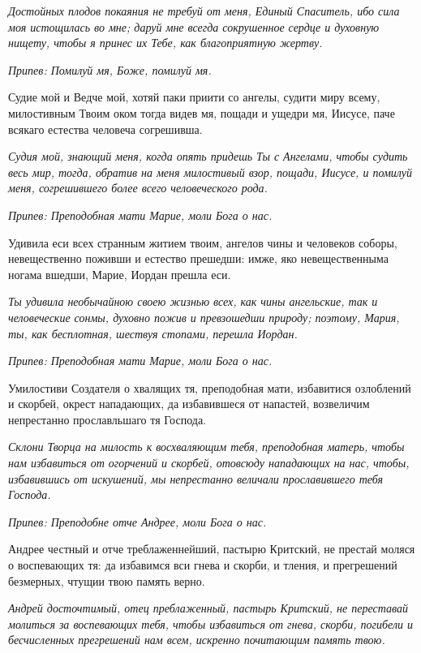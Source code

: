 \itshape Достойных плодов покаяния не требуй от меня, Единый Спаситель, ибо сила моя истощилась во мне; даруй мне всегда сокрушенное сердце и духовную нищету, чтобы я принес их Тебе, как благоприятную жертву.\normalfont{}


\itshape Припев:\normalfont{} Помилуй мя, Боже, помилуй мя.


Судие мой и Ведче мой, хотяй паки приити со ангелы, судити миру всему, милостивным Твоим оком тогда видев мя, пощади и ущедри мя, Иисусе, паче всякаго естества человеча согрешивша.


\itshape Судия мой, знающий меня, когда опять придешь Ты с Ангелами, чтобы судить весь мир, тогда, обратив на меня милостивый взор, пощади, Иисусе, и помилуй меня, согрешившего более всего человеческого рода.\normalfont{}


\itshape Припев:\normalfont{} Преподобная мати Марие, моли Бога о нас.


Удивила еси всех странным житием твоим, ангелов чины и человеков соборы, невещественно поживши и естество прешедши: имже, яко невещественныма ногама вшедши, Марие, Иордан прешла еси.


\itshape Ты удивила необычайною своею жизнью всех, как чины ангельские, так и человеческие сонмы, духовно пожив и превзошедши природу; поэтому, Мария, ты, как бесплотная, шествуя стопами, перешла Иордан.\normalfont{}


\itshape Припев:\normalfont{} Преподобная мати Марие, моли Бога о нас.


Умилостиви Создателя о хвалящих тя, преподобная мати, избавитися озлоблений и скорбей, окрест нападающих, да избавившеся от напастей, возвеличим непрестанно прославльшаго тя Господа.


\itshape Склони Творца на милость к восхваляющим тебя, преподобная матерь, чтобы нам избавиться от огорчений и скорбей, отовсюду нападающих на нас, чтобы, избавившись от искушений, мы непрестанно величали прославившего тебя Господа.\normalfont{}


\itshape Припев:\normalfont{} Преподобне отче Андрее, моли Бога о нас.


Андрее честный и отче треблаженнейший, пастырю Критский, не престай моляся о воспевающих тя: да избавимся вси гнева и скорби, и тления, и прегрешений безмерных, чтущии твою память верно.


\itshape Андрей досточтимый, отец преблаженный, пастырь Критский, не переставай молиться за воспевающих тебя, чтобы избавиться от гнева, скорби, погибели и бесчисленных прегрешений нам всем, искренно почитающим память твою.\normalfont{}


